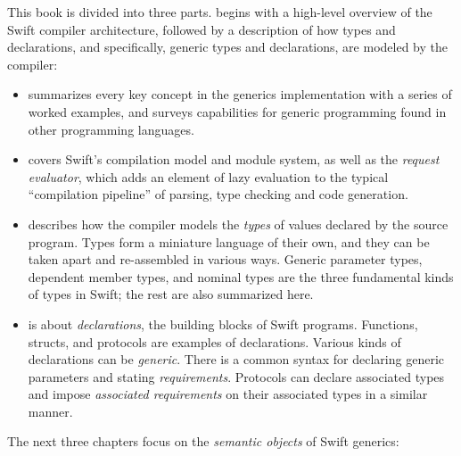 \documentclass[../generics]{subfiles}
\begin{document}
This book is divided into three parts.  begins with a high-level overview of the Swift compiler architecture, followed by a description of how types and declarations, and specifically, generic types and declarations, are modeled by the compiler:
\begin{itemize}
\item {} summarizes every key concept in the generics implementation with a series of worked examples, and surveys capabilities for generic programming found in other programming languages.
\item {} covers Swift's compilation model and module system, as well as the \emph{request evaluator}, which adds an element of lazy evaluation to the typical ``compilation pipeline'' of parsing, type checking and code generation.
\item {} describes how the compiler models the \emph{types} of values declared by the source program. Types form a miniature language of their own, and they can be taken apart and re-assembled in various ways. Generic parameter types, dependent member types, and nominal types are the three fundamental kinds of types in Swift; the rest are also summarized here.
\item {} is about \emph{declarations}, the building blocks of Swift programs. Functions, structs, and protocols are examples of declarations. Various kinds of declarations can be \emph{generic}. There is a common syntax for declaring generic parameters and stating \emph{requirements}. Protocols can declare associated types and impose \emph{associated requirements} on their associated types in a similar manner.
\end{itemize}
The next three chapters focus on the \emph{semantic objects} of Swift generics: 
\end{document}
